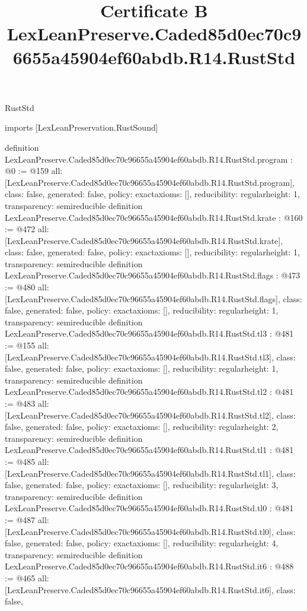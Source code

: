 \begin{lexlean}{RustStd}
\title{Certificate B LexLeanPreserve.Caded85d0ec70c96655a45904ef60abdb.R14.RustStd}
\begin{coremodule}
imports [LexLeanPreservation.RustSound]

definition LexLeanPreserve.Caded85d0ec70c96655a45904ef60abdb.R14.RustStd.program : @0 := @159 {
  all: [LexLeanPreserve.Caded85d0ec70c96655a45904ef60abdb.R14.RustStd.program],
  class: false,
  generated: false,
  policy: exact{axioms: []},
  reducibility: regular{height: 1},
  transparency: semireducible
}
definition LexLeanPreserve.Caded85d0ec70c96655a45904ef60abdb.R14.RustStd.krate : @160 := @472 {
  all: [LexLeanPreserve.Caded85d0ec70c96655a45904ef60abdb.R14.RustStd.krate],
  class: false,
  generated: false,
  policy: exact{axioms: []},
  reducibility: regular{height: 1},
  transparency: semireducible
}
definition LexLeanPreserve.Caded85d0ec70c96655a45904ef60abdb.R14.RustStd.flags : @473 := @480 {
  all: [LexLeanPreserve.Caded85d0ec70c96655a45904ef60abdb.R14.RustStd.flags],
  class: false,
  generated: false,
  policy: exact{axioms: []},
  reducibility: regular{height: 1},
  transparency: semireducible
}
definition LexLeanPreserve.Caded85d0ec70c96655a45904ef60abdb.R14.RustStd.tl3 : @481 := @155 {
  all: [LexLeanPreserve.Caded85d0ec70c96655a45904ef60abdb.R14.RustStd.tl3],
  class: false,
  generated: false,
  policy: exact{axioms: []},
  reducibility: regular{height: 1},
  transparency: semireducible
}
definition LexLeanPreserve.Caded85d0ec70c96655a45904ef60abdb.R14.RustStd.tl2 : @481 := @483 {
  all: [LexLeanPreserve.Caded85d0ec70c96655a45904ef60abdb.R14.RustStd.tl2],
  class: false,
  generated: false,
  policy: exact{axioms: []},
  reducibility: regular{height: 2},
  transparency: semireducible
}
definition LexLeanPreserve.Caded85d0ec70c96655a45904ef60abdb.R14.RustStd.tl1 : @481 := @485 {
  all: [LexLeanPreserve.Caded85d0ec70c96655a45904ef60abdb.R14.RustStd.tl1],
  class: false,
  generated: false,
  policy: exact{axioms: []},
  reducibility: regular{height: 3},
  transparency: semireducible
}
definition LexLeanPreserve.Caded85d0ec70c96655a45904ef60abdb.R14.RustStd.tl0 : @481 := @487 {
  all: [LexLeanPreserve.Caded85d0ec70c96655a45904ef60abdb.R14.RustStd.tl0],
  class: false,
  generated: false,
  policy: exact{axioms: []},
  reducibility: regular{height: 4},
  transparency: semireducible
}
definition LexLeanPreserve.Caded85d0ec70c96655a45904ef60abdb.R14.RustStd.it6 : @488 := @465 {
  all: [LexLeanPreserve.Caded85d0ec70c96655a45904ef60abdb.R14.RustStd.it6],
  class: false,
}
\end{coremodule}
\end{lexlean}
